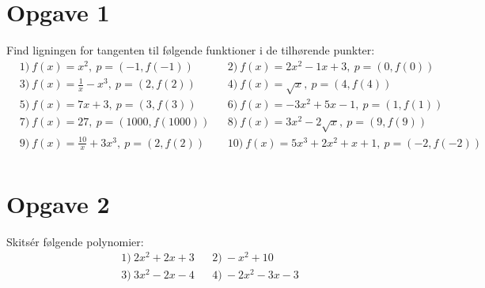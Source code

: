 \section*{Opgave 1}
Find ligningen for tangenten til følgende funktioner i de tilhørende punkter:
\begin{align*}
&1) \ f(x) = x^2,\  p=(-1,f(-1))  &&2) \   f(x)=2x^2-1x+3, \ p=(0,f(0))    \\
&3) \ f(x) = \frac{1}{x} -x^3, \ p=(2,f(2))   &&4) \ f(x) = \sqrt{x}, \ p=(4,f(4))    \\
&5) \ f(x) = 7x+3,\ p=(3,f(3))   &&6) \ f(x) = -3x^2+5x-1, \ p=(1,f(1))     \\
&7) \ f(x) = 27, \ p= (1000,f(1000))   &&8) \ f(x) = 3x^2-2\sqrt{x}, \ p=(9,f(9))     \\
&9) \ f(x) = \frac{10}{x}+3x^3, \ p= (2,f(2))   &&10) \ f(x) = 5x^3+2x^2+x+1, \ p=(-2,f(-2))     \\
\end{align*}

\section*{Opgave 2}
Skitsér følgende polynomier:
\begin{align*}
&1) \ 2x^2+2x+3     &&2) \ -x^2 +10   \\
&3) \  3x^2-2x-4    &&4) \ -2x^2-3x-3  \\
\end{align*}